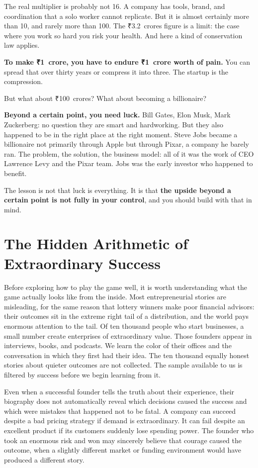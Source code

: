 The real multiplier is probably not 16. A company has tools, brand, and coordination that a solo worker cannot replicate. But it is almost certainly more than 10, and rarely more than 100. The \mbox{₹3.2 crores} figure is a limit: the case where you work so hard you risk your health. And here a kind of conservation law applies.

\textbf{To make \mbox{₹1 crore}, you have to endure \mbox{₹1 crore} worth of pain.} You can spread that over thirty years or compress it into three. The startup is the compression.

But what about \mbox{₹100 crores}? What about becoming a billionaire?

\textbf{Beyond a certain point, you need luck.} Bill Gates, Elon Musk, Mark Zuckerberg: no question they are smart and hardworking. But they also happened to be in the right place at the right moment. Steve Jobs became a billionaire not primarily through Apple but through Pixar, a company he barely ran. The problem, the solution, the business model: all of it was the work of CEO Lawrence Levy and the Pixar team. Jobs was the early investor who happened to benefit.

The lesson is not that luck is everything. It is that \textbf{the upside beyond a certain point is not fully in your control}, and you should build with that in mind.

\section{The Hidden Arithmetic of Extraordinary Success}
\label{sec:ch01-hidden-arithmetic}

Before exploring how to play the game well, it is worth understanding what the game actually looks like from the inside. Most entrepreneurial stories are misleading, for the same reason that lottery winners make poor financial advisors: their outcomes sit in the extreme right tail of a distribution, and the world pays enormous attention to the tail. Of ten thousand people who start businesses, a small number create enterprises of extraordinary value. Those founders appear in interviews, books, and podcasts. We learn the color of their offices and the conversation in which they first had their idea. The ten thousand equally honest stories about quieter outcomes are not collected. The sample available to us is filtered by success before we begin learning from it.

Even when a successful founder tells the truth about their experience, their biography does not automatically reveal which decisions caused the success and which were mistakes that happened not to be fatal. A company can succeed despite a bad pricing strategy if demand is extraordinary. It can fail despite an excellent product if its customers suddenly lose spending power. The founder who took an enormous risk and won may sincerely believe that courage caused the outcome, when a slightly different market or funding environment would have produced a different story.

